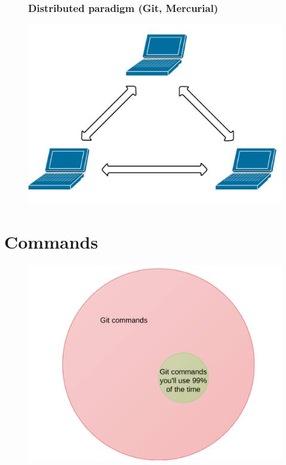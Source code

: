 \documentclass{beamer}
\begin{document}
\begin{frame}
    \begin{figure}[h!]
        \frametitle{Distributed paradigm (Git, Mercurial)}
        \begin{center}
            \includegraphics[scale=0.2]{distributed.png}
        \end{center}
    \end{figure}
\end{frame}

\section{Commands}

\begin{frame}
    \begin{figure}[h!]
        \begin{center}
            \includegraphics[scale=0.09]{git_commands1.png}
        \end{center}
    \end{figure}
\end{frame}
\end{document}
